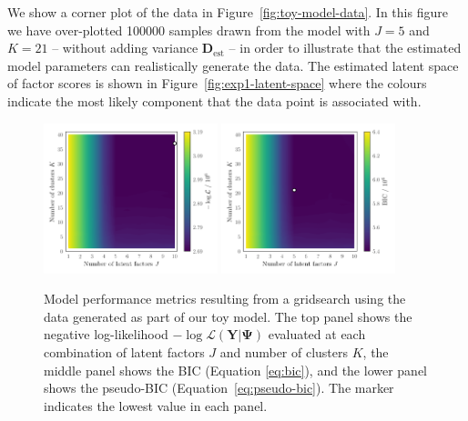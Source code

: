 \documentclass[twocolumn]{aastex61}
\newcommand{\vect}[1]{\boldsymbol{\mathbf{#1}}}
\renewcommand{\vec}[1]{\vect{#1}}
\newcommand{\data}{\textbf{Y}}
\newcommand{\specificvariance}{\vec{D}}
\begin{document}
We show a corner plot of the data in Figure~\ref{fig:toy-model-data}.
In this figure we have over-plotted 100000 samples drawn from the model
with $J = 5$ and $K = 21$
-- without adding variance $\specificvariance_\textrm{est}$ %
-- in order to illustrate that the
estimated model parameters can realistically generate the data.
The estimated latent space of factor scores is shown in 
Figure~\ref{fig:exp1-latent-space} where the colours indicate the
most likely component that the data point is associated with.





\begin{figure}
	\includegraphics[width=0.45\textwidth]{experiments/exp1-gridsearch-ll-contours.png}
	\includegraphics[width=0.45\textwidth]{experiments/exp1-gridsearch-bic-contours.png}
    \caption{Model performance metrics resulting from a gridsearch using the
    		 data generated as part of our toy model. The top 
		 	 panel shows the negative log-likelihood 
			 $-\log{\mathcal{L}\left(\data|\vec\Psi\right)}$ 
			 evaluated at each combination of latent factors $J$ and number 
			 of clusters $K$, the middle panel shows the BIC (Equation \ref{eq:bic}), 
			 and the lower panel shows
			 the pseudo-BIC
			 (Equation~\ref{eq:pseudo-bic}). The marker indicates the 
			 lowest value in each panel.}
    \label{fig:experiment-1-gridsearch}
\end{figure}
\end{document}
